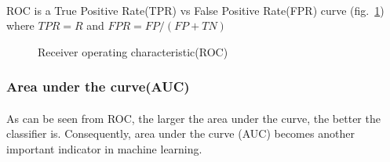 \paragraph{}
ROC is a True Positive Rate(TPR) vs False Positive Rate(FPR) curve (fig.~\ref{lr_fig:performance_roc}) where $TPR=R$ and $FPR=FP/(FP+TN)$
\begin{figure}[h!]
    \centering
    \caption{Receiver operating characteristic(ROC)}
    \label{lr_fig:performance_roc}
\end{figure}

\subsubsection{Area under the curve(AUC)}
\paragraph{}
As can be seen from ROC, the larger the area under the curve, the better the classifier is.
Consequently, area under the curve (AUC) becomes another important indicator in machine learning.